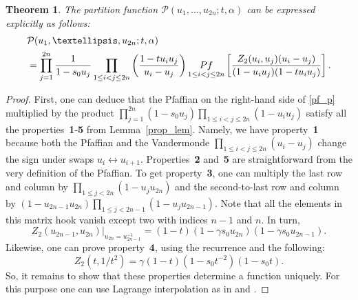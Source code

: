 \documentclass[11pt]{article}
\newtheorem{theorem}[theo]{Theorem}
\theoremstyle{definition}
\newcommand{\pf}{\mathop{\rm Pf}}
\begin{document}
\begin{theorem} \label{pf_thm}
	The partition function $\mathcal{P} (u_1, \dots, u_{2n}; t, \alpha)$ can be expressed explicitly as follows:
	\begin{equation}
	\begin{split}
	&
	\label{pf_p}
	\mathcal{P} (u_1, \dots, u_{2n}; t, \alpha) \\&
	= 	\prod_{j = 1}^{2n} \frac{1}{1 - s_0 u_j} \prod_{1 \leq i<j \leq 2n}
	\left(
	\frac{1-t u_i u_j}{u_i - u_j}
	\right)
	\pf_{1\leq i < j \leq 2n}
	\left[
	\frac{Z_{2}(u_i, u_j) (u_i - u_j)}
	{(1-u_i u_j) (1-t u_i u_j)}
	\right].
	\end{split}
	\end{equation}
\end{theorem}
\begin{proof}
	First, one can deduce that the Pfaffian on the right-hand side of \eqref{pf_p} multiplied by the product $\prod_{j = 1}^{2n} (1 - s_0 u_j) \prod_{1 \leq i < j \leq 2n} (1 - u_{i} u_{j}) $ satisfy all the properties~\textbf{1}-\textbf{5} from Lemma~\ref{prop_lem}. Namely, we have property~\textbf{1} because both the Pfaffian and the Vandermonde $\prod_{1 \leq i < j \leq 2n} (u_{i} - u_{j}) $ change the sign under swaps $u_i \leftrightarrow u_{i+1}$. Properties~\textbf{2} and~\textbf{5} are straightforward from the very definition of the Pfaffian. To get property~\textbf{3}, one can multiply the last row and column by $\prod_{1 \leq j < 2n} (1 - u_{j} u_{2n}) $ and the second-to-last row and column by $(1 - u_{2n-1} u_{2n})\prod_{1 \leq j < 2n-1} (1 - u_{j} u_{2n-1}) $. Note that all the elements in this matrix hook vanish except two with indices $n-1$ and $n$. In turn,
	\begin{equation*}
	Z_{2}(u_{2n-1},u_{2n})\big\vert_{u_{2n}=u_{2n-1}^{-1}}= (1-t)
	(1-\gamma s_0u_{2n})(1-\gamma s_0 u_{2n-1}).
	\end{equation*}
	Likewise, one can prove property~\textbf{4}, using the recurrence and the following: \begin{equation*}Z_{2}(t,  1 / t^2) = \gamma(1 - t)(1 - s_{0} t^{-2})(1 -s_{0} t).\end{equation*}
	So, it remains to show that these properties determine a function uniquely. For this purpose one can use Lagrange interpolation as in  \cite{Pet21} and \cite[Appendix B]{WZJ16}.
	

\end{proof}
\end{document}
